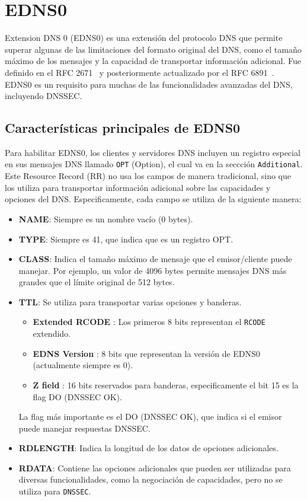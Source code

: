 \chapter{EDNS0}

Extension DNS 0 (EDNS0) es una extensión del protocolo DNS que permite superar algunas de las limitaciones del formato original del DNS, 
como el tamaño máximo de los mensajes y la capacidad de transportar información adicional. Fue definido en el RFC 2671~\cite{RFC2671} y posteriormente actualizado por el RFC 6891~\cite{RFC6891}. 
EDNS0 es un requisito para muchas de las funcionalidades avanzadas del DNS, incluyendo DNSSEC.

\section{Características principales de EDNS0}

Para habilitar EDNS0, los clientes y servidores DNS incluyen un registro especial en sus mensajes DNS llamado \texttt{OPT} (Option), el cual va en la seccción \texttt{Additional}.
Este Resource Record (RR) no usa los campos de manera tradicional, sino que los utiliza para transportar información adicional sobre las capacidades y opciones del DNS.
Especificamente, cada campo se utiliza de la siguiente manera:

\begin{itemize}
    \item \textbf{NAME}: Siempre es un nombre vacío (0 bytes).
    \item \textbf{TYPE}: Siempre es 41, que indica que es un registro OPT.
    \item \textbf{CLASS}: Indica el tamaño máximo de mensaje que el emisor/cliente puede manejar. Por ejemplo, un valor de 4096 bytes permite mensajes DNS más grandes que el límite original de 512 bytes.
    \item \textbf{TTL}: Se utiliza para transportar varias opciones y banderas.
                        \begin{itemize}
                            \item \textbf{Extended RCODE} : Los primeros 8 bits representan el \texttt{RCODE} extendido.
                            \item \textbf{EDNS Version} :  8 bits que representan la versión de EDNS0 (actualmente siempre es 0).
                            \item \textbf{Z field} : 16 bits reservados para banderas, especificamente el bit 15 es la flag DO (DNSSEC OK).
                        \end{itemize}
                        La flag más importante es el DO (DNSSEC OK), que indica si el emisor puede manejar respuestas DNSSEC.
    \item \textbf{RDLENGTH}: Indica la longitud de los datos de opciones adicionales.
    \item \textbf{RDATA}: Contiene las opciones adicionales que pueden ser utilizadas para diversas funcionalidades, como la negociación de capacidades, pero no se utiliza para \texttt{DNSSEC}.
\end{itemize}


